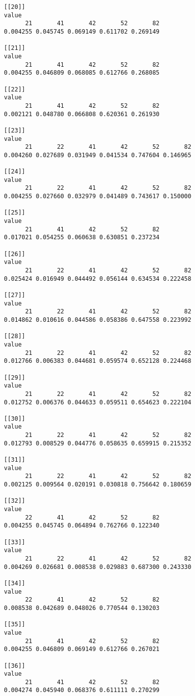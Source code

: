 \documentclass[
  letterpaper,
]{book}
\begin{document}
\begin{verbatim}
[[20]]
value
      21       41       42       52       82 
0.004255 0.045745 0.069149 0.611702 0.269149 

[[21]]
value
      21       41       42       52       82 
0.004255 0.046809 0.068085 0.612766 0.268085 

[[22]]
value
      21       41       42       52       82 
0.002121 0.048780 0.066808 0.620361 0.261930 

[[23]]
value
      21       22       41       42       52       82 
0.004260 0.027689 0.031949 0.041534 0.747604 0.146965 

[[24]]
value
      21       22       41       42       52       82 
0.004255 0.027660 0.032979 0.041489 0.743617 0.150000 

[[25]]
value
      21       41       42       52       82 
0.017021 0.054255 0.060638 0.630851 0.237234 

[[26]]
value
      21       22       41       42       52       82 
0.025424 0.016949 0.044492 0.056144 0.634534 0.222458 

[[27]]
value
      21       22       41       42       52       82 
0.014862 0.010616 0.044586 0.058386 0.647558 0.223992 

[[28]]
value
      21       22       41       42       52       82 
0.012766 0.006383 0.044681 0.059574 0.652128 0.224468 

[[29]]
value
      21       22       41       42       52       82 
0.012752 0.006376 0.044633 0.059511 0.654623 0.222104 

[[30]]
value
      21       22       41       42       52       82 
0.012793 0.008529 0.044776 0.058635 0.659915 0.215352 

[[31]]
value
      21       22       41       42       52       82 
0.002125 0.009564 0.020191 0.030818 0.756642 0.180659 

[[32]]
value
      22       41       42       52       82 
0.004255 0.045745 0.064894 0.762766 0.122340 

[[33]]
value
      21       22       41       42       52       82 
0.004269 0.026681 0.008538 0.029883 0.687300 0.243330 

[[34]]
value
      22       41       42       52       82 
0.008538 0.042689 0.048026 0.770544 0.130203 

[[35]]
value
      21       41       42       52       82 
0.004255 0.046809 0.069149 0.612766 0.267021 

[[36]]
value
      21       41       42       52       82 
0.004274 0.045940 0.068376 0.611111 0.270299 


\end{verbatim}
\end{document}
